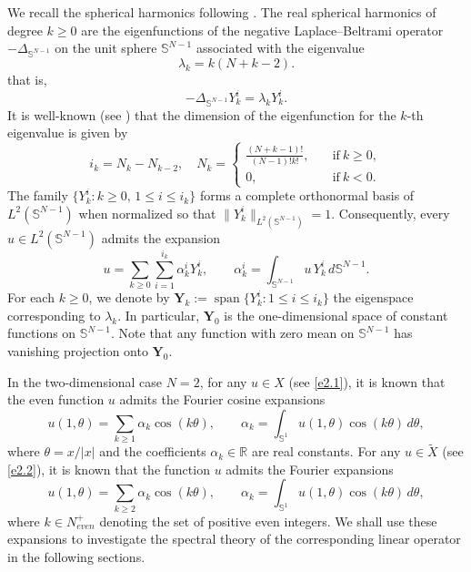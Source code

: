 \documentclass[reqno]{amsart}
\numberwithin{equation}{section}
\numberwithin{equation}{section}
\numberwithin{equation}{section}
\begin{document}
We recall the spherical harmonics following \cite{AT}. The real spherical harmonics of degree \(k \geq 0\) are the eigenfunctions of the negative Laplace--Beltrami operator \(-\Delta_{\mathbb{S}^{N-1}}\) on the unit sphere \(\mathbb{S}^{N-1}\) associated with the eigenvalue
\[
\lambda_k = k(N + k - 2).
\]
that is,
\[
-\Delta_{\mathbb{S}^{N-1}} Y_k^i = \lambda_k Y_k^i.
\]
It is well-known (see \cite[Chapter 4]{ambook}) that the dimension of the eigenfunction for the $k$-th eigenvalue is given by
$$i_k=N_k-N_{k-2},\quad N_k=\begin{cases}
\frac{(N+k-1)!}{(N-1)!k!},\quad &\mbox{if}~k\geq0,\\
0,&\mbox{if}~k<0.
\end{cases}$$
The family \(\{Y_k^i : k \geq 0,\, 1\leq i \leq i_k\}\) forms a complete orthonormal basis of \(L^2(\mathbb{S}^{N-1})\) when normalized so that \(\|Y_k^i\|_{L^2(\mathbb{S}^{N-1})} = 1\). Consequently, every \(u \in L^2(\mathbb{S}^{N-1})\) admits the expansion
\[
u = \sum_{k \geq 0} \sum_{i=1}^{i_k} \alpha_k^i Y_k^i, \qquad \alpha_k^i = \int_{\mathbb{S}^{N-1}} u \, Y_k^i \, d\mathbb{S}^{N-1}.
\]
For each \(k \geq 0\), we denote by \(\mathbf{Y}_k := \operatorname{span}\{Y_k^i : 1\leq i \leq i_k\}\) the eigenspace corresponding to \(\lambda_k\). In particular, \(\mathbf{Y}_0\) is the one-dimensional space of constant functions on \(\mathbb{S}^{N-1}\). Note that any function with zero mean on \(\mathbb{S}^{N-1}\) has vanishing projection onto \(\mathbf{Y}_0\).

In the two-dimensional case \(N=2\), for any \(u \in X\) (see \eqref{e2.1}), it is known that the even function \(u\) admits the Fourier cosine expansions
\begin{equation}\label{e2.4}
u(1,\theta) = \sum_{k \geq 1} \alpha_k \cos(k\theta), \qquad \alpha_k = \int_{\mathbb{S}^1} u(1,\theta) \cos(k\theta) \, d\theta,
\end{equation}
where \(\theta = x/|x|\) and the coefficients \(\alpha_k \in \mathbb{R}\) are real constants.
For any \(u \in \widetilde{X}\) (see \eqref{e2.2}), it is known that the function \(u\) admits the Fourier expansions
\begin{equation}\label{e2.5}
u(1,\theta) = \sum_{k \geq 2} \alpha_k \cos(k\theta), \qquad \alpha_k = \int_{\mathbb{S}^1} u(1,\theta) \cos(k\theta) \, d\theta,
\end{equation}
where $k\in N^+_{even}$ denoting the set of positive even integers. We shall use these expansions to investigate the spectral theory of the corresponding linear operator in the following sections.
\end{document}
